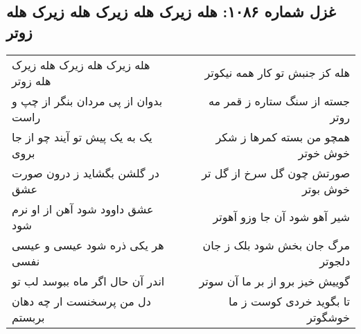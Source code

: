\begin{center}
\section*{غزل شماره ۱۰۸۶: هله زیرک هله زیرک هله زیرک هله زوتر}
\label{sec:1086}
\begin{longtable}{l p{0.5cm} r}
هله زیرک هله زیرک هله زیرک هله زوتر
&&
هله کز جنبش تو کار همه نیکوتر
\\
بدوان از پی مردان بنگر از چپ و راست
&&
جسته از سنگ ستاره ز قمر مه روتر
\\
یک به یک پیش تو آیند چو از جا بروی
&&
همچو من بسته کمرها ز شکر خوش خوتر
\\
در گلشن بگشاید ز درون صورت عشق
&&
صورتش چون گل سرخ از گل تر خوش بوتر
\\
عشق داوود شود آهن از او نرم شود
&&
شیر آهو شود آن جا وزو آهوتر
\\
هر یکی ذره شود عیسی و عیسی نفسی
&&
مرگ جان بخش شود بلک ز جان دلجوتر
\\
اندر آن حال اگر ماه ببوسد لب تو
&&
گوییش خیز برو از بر ما آن سوتر
\\
دل من پرسخنست ار چه دهان بربستم
&&
تا بگوید خردی کوست ز ما خوشگوتر
\\
\end{longtable}
\end{center}
